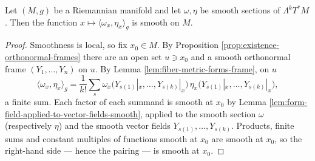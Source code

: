 \begin{lemma}
\label{lem:fiber-metric-forms-smooth}
\leanok
{}
Let $(M,g)$ be a Riemannian manifold and let $\omega, \eta$ be smooth sections of $\Lambda^k T^*M$. Then the function $x \mapsto \langle \omega_x, \eta_x \rangle_g$ is smooth on $M$.
\end{lemma}
\begin{proof}
\leanok
{}
Smoothness is local, so fix $x_0 \in M$. By Proposition \ref{prop:existence-orthonormal-frames} there are an open set $u \ni x_0$ and a smooth orthonormal frame $(Y_1, \ldots, Y_n)$ on $u$. By Lemma \ref{lem:fiber-metric-forms-frame}, on $u$
\[
\langle \omega_x, \eta_x \rangle_g = \frac{1}{k!} \sum_{s} \omega_x\big(Y_{s(1)}|_x, \ldots, Y_{s(k)}|_x\big)\, \eta_x\big(Y_{s(1)}|_x, \ldots, Y_{s(k)}|_x\big),
\]
a finite sum. Each factor of each summand is smooth at $x_0$ by Lemma \ref{lem:form-field-applied-to-vector-fields-smooth}, applied to the smooth section $\omega$ (respectively $\eta$) and the smooth vector fields $Y_{s(1)}, \ldots, Y_{s(k)}$. Products, finite sums and constant multiples of functions smooth at $x_0$ are smooth at $x_0$, so the right-hand side --- hence the pairing --- is smooth at $x_0$.
\end{proof}

